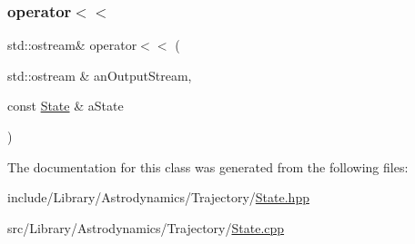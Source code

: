 \subsubsection{\texorpdfstring{operator$<$$<$}{operator<<}}
{\footnotesize\ttfamily std\+::ostream\& operator$<$$<$ (\begin{DoxyParamCaption}\item[{std\+::ostream \&}]{an\+Output\+Stream,  }\item[{const \hyperlink{classlibrary_1_1astro_1_1trajectory_1_1_state}{State} \&}]{a\+State }\end{DoxyParamCaption})\hspace{0.3cm}{\ttfamily [friend]}}



The documentation for this class was generated from the following files\+:\begin{DoxyCompactItemize}
\item 
include/\+Library/\+Astrodynamics/\+Trajectory/\hyperlink{_trajectory_2_state_8hpp}{State.\+hpp}\item 
src/\+Library/\+Astrodynamics/\+Trajectory/\hyperlink{_trajectory_2_state_8cpp}{State.\+cpp}\end{DoxyCompactItemize}
